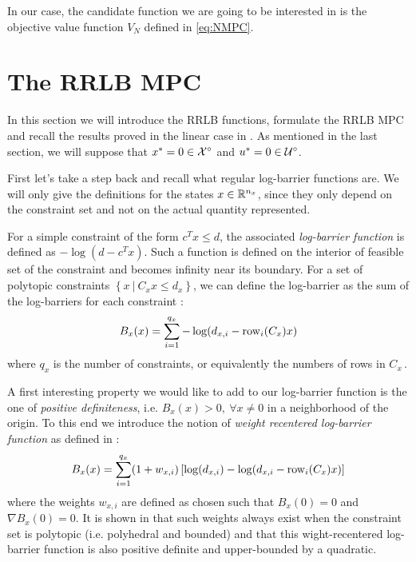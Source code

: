 \documentclass[12pt]{article}
\begin{document}
\vspace{12pt}

In our case, the candidate function we are going to be interested in is the objective value function $V_N$ defined in \ref{eq:NMPC}.


\section{The RRLB MPC}\label{sec:RRLB-MPC}

In this section we will introduce the RRLB functions, formulate the RRLB MPC and recall the results proved in the linear case in \cite{RRLB-linear-MPC}.
As mentioned in the last section, we will suppose that $x^*=0\in\cal{X}^\circ$ and $u^*=0\in\cal{U}^\circ$.

\vspace{12pt}

First let's take a step back and recall what regular log-barrier functions are.
We will only give the definitions for the states $x\in\R^{n_x}$, since they only depend on the constraint set and not on the actual quantity represented.

For a simple constraint of the form $c^Tx\leq d$, the associated \textit{log-barrier function} is defined as $-\log(d-c^Tx)$.
Such a function is defined on the interior of feasible set of the constraint and becomes infinity near its boundary.
For a set of polytopic constraints $\left\{ x~|~C_xx\leq d_x \right\}$, we can define the log-barrier as the sum of the log-barriers for each constraint :
$$B_x(x)=\sum_{i=1}^{q_x}-\log(d_{x,i}-\rm{row}_i(C_x)x)$$
where $q_x$ is the number of constraints, or equivalently the numbers of rows in $C_x$\,.

A first interesting property we would like to add to our log-barrier function is the one of \textit{positive definiteness}, i.e. $B_x(x)>0,~\forall x\neq 0$ in a neighborhood of the origin.
To this end we introduce the notion of \textit{weight recentered log-barrier function} as defined in \cite{RLB} :
$$B_x(x)=\sum_{i=1}^{q_x}(1+w_{x,i})\left[\log(d_{x,i})-\log(d_{x,i}-\rm{row}_i(C_x)x)\right]$$
where the weights $w_{x,i}$ are defined as chosen such that $B_x(0)=0$ and $\nabla B_x(0)=0$.
It is shown in \cite{RLB} that such weights always exist when the constraint set is polytopic (i.e. polyhedral and bounded) and that this wight-recentered log-barrier function is also positive definite and upper-bounded by a quadratic.
\end{document}
